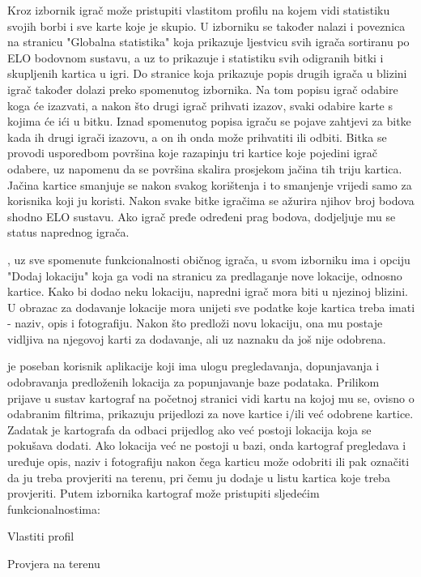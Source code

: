 		Kroz izbornik igrač može pristupiti vlastitom profilu na kojem vidi statistiku svojih borbi i sve karte koje je skupio. U izborniku se također nalazi i poveznica na stranicu "Globalna statistika" koja prikazuje ljestvicu svih igrača sortiranu po ELO bodovnom sustavu, a uz to prikazuje i statistiku svih odigranih bitki i skupljenih kartica u igri. Do stranice koja prikazuje popis drugih igrača u blizini igrač također dolazi preko spomenutog izbornika. Na tom popisu igrač odabire koga će izazvati, a nakon što drugi igrač prihvati izazov, svaki odabire karte s kojima će ići u bitku. Iznad spomenutog popisa igraču se pojave zahtjevi za bitke kada ih drugi igrači izazovu, a on ih onda može prihvatiti ili odbiti. Bitka se provodi usporedbom površina koje razapinju tri kartice koje pojedini igrač odabere, uz napomenu da se površina skalira prosjekom jačina tih triju kartica. Jačina kartice smanjuje se nakon svakog korištenja i to smanjenje vrijedi samo za korisnika koji ju koristi. Nakon svake bitke igračima se ažurira njihov broj bodova shodno ELO sustavu. Ako igrač pređe određeni prag bodova, dodjeljuje mu se status naprednog igrača.
		
		, uz sve spomenute funkcionalnosti običnog igrača, u svom izborniku ima i opciju "Dodaj lokaciju" koja ga vodi na stranicu za predlaganje nove lokacije, odnosno kartice. Kako bi dodao neku lokaciju, napredni igrač mora biti u njezinoj blizini. U obrazac za dodavanje lokacije mora unijeti sve podatke koje kartica treba imati - naziv, opis i fotografiju. Nakon što predloži novu lokaciju, ona mu postaje vidljiva na njegovoj karti za dodavanje, ali uz naznaku da još nije odobrena.
		
		 je poseban korisnik aplikacije koji ima ulogu pregledavanja, dopunjavanja i odobravanja predloženih lokacija za popunjavanje baze podataka. Prilikom prijave u sustav kartograf na početnoj stranici vidi kartu na kojoj mu se, ovisno o odabranim filtrima, prikazuju prijedlozi za nove kartice i/ili već odobrene kartice. Zadatak je kartografa da odbaci prijedlog ako već postoji lokacija koja se pokušava dodati. Ako lokacija već ne postoji u bazi, onda kartograf pregledava i uređuje opis, naziv i fotografiju nakon čega karticu može odobriti ili pak označiti da ju treba provjeriti na terenu, pri čemu ju dodaje u listu kartica koje treba provjeriti. Putem izbornika kartograf može pristupiti sljedećim funkcionalnostima:
		
		\begin{packed_item}
		    \item Vlastiti profil
		    \item Provjera na terenu
		\end{packed_item}
		

